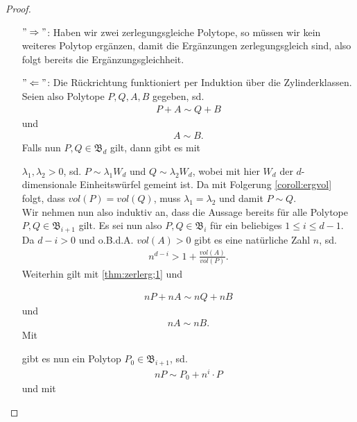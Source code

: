 \documentclass[11pt,titlepage]{article}
\theoremstyle{definition}
\theoremstyle{remark}
\begin{document}
	\begin{proof}
		\noindent
		\begin{itemize}
			\item[$"\Rightarrow"$:] Haben wir zwei zerlegungsgleiche Polytope, so müssen wir kein weiteres Polytop ergänzen, damit die Ergänzungen zerlegungsgleich sind, also folgt bereits die Ergänzungsgleichheit.
			
			\item[$"\Leftarrow"$:] Die Rückrichtung funktioniert per 
			Induktion über die Zylinderklassen. Seien also Polytope 
			$P,Q,A,B$ gegeben, sd. 
			\begin{align}
				P+A\sim Q+B \label{thm:zerlerg;1}
			\end{align}
			und
			\begin{align}
				A\sim B. \label{thm:zerlerg;2}
			\end{align}
			Falls nun $P,Q\in \mathfrak{B}_d$ gilt, dann gibt es mit 
			
			
			$\lambda_1,\lambda_2 >0$, sd. $P\sim \lambda_1 W_d$ und 
			$Q\sim \lambda_2 W_d$, wobei mit hier $W_d$ der $d$-dimensionale 
			Einheitswürfel gemeint ist. Da mit Folgerung \ref{coroll:ergvol} 
			folgt, dass $vol(P)=vol(Q)$, muss $\lambda_1 =\lambda_2$ und 
			damit $P\sim Q$. \\
			Wir nehmen nun also induktiv an, dass die Aussage bereits für alle 
			Polytope $P,Q\in\mathfrak{B}_{i+1}$ gilt. Es sei nun also 
			$P,Q\in\mathfrak{B}_i$ für ein beliebiges $1\leq i\leq d-1$. 
			Da $d-i>0$ und o.B.d.A. $vol(A)>0$ gibt es eine natürliche Zahl $n$, sd. 
			\begin{align}
				n^{d-i}>1+\frac{vol(A)}{vol(P)}. \label{thm:zerlerg;3}
			\end{align}
			Weiterhin gilt mit \ref{thm:zerlerg;1} und 
			
			
			\begin{align}
				nP+nA\sim nQ+nB \label{thm:zerlerg;4}
			\end{align}
			und
			\begin{align}
				nA\sim nB. \label{thm:zerlerg;5}
			\end{align}
			Mit 
			
			
			gibt es nun ein Polytop $P_0\in\mathfrak{B}_{i+1}$, sd.
			\begin{align}
				nP\sim P_0 +n^i\cdot P \label{thm:zerlerg;6}
			\end{align}
			und mit
			

\end{itemize}
\end{proof}
\end{document}
